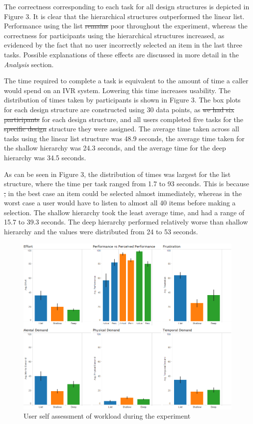 \documentclass{sigchi}
\providecommand{\DIFaddtex}[1]{{\protect\color{blue}\uwave{#1}}} %
\providecommand{\DIFdeltex}[1]{{\protect\color{red}\sout{#1}}}                      %
\providecommand{\DIFaddbegin}{} %
\providecommand{\DIFaddend}{} %
\providecommand{\DIFdelbegin}{} %
\providecommand{\DIFdelend}{} %
\providecommand{\DIFadd}[1]{\texorpdfstring{\DIFaddtex{#1}}{#1}} %
\providecommand{\DIFdel}[1]{\texorpdfstring{\DIFdeltex{#1}}{}} %
\begin{document}
The correctness corresponding to each task for all design structures is depicted in Figure 3. It is clear that the hierarchical structures outperformed the linear list. Performance using the list \DIFdelbegin \DIFdel{remains }\DIFdelend \DIFaddbegin \DIFadd{remained }\DIFaddend poor throughout the experiment, whereas the correctness for participants using the hierarchical structures increased, as evidenced by the fact that no user incorrectly selected an item in the last three tasks. Possible explanations of these effects are discussed in more detail in the \textit{Analysis} section.

The time required to complete a task is equivalent to the amount of time a caller would spend on an IVR system. Lowering this time increases usability. The distribution of times taken by participants is shown in Figure 3. The box plots for each design structure are constructed using 30 data points, as \DIFdelbegin \DIFdel{we had six participants }\DIFdelend \DIFaddbegin \DIFadd{six participants were tested }\DIFaddend for each design structure, and all users completed five tasks for the \DIFdelbegin \DIFdel{specific design }\DIFdelend structure they were assigned. The average time taken across all tasks using the linear list structure was 48.9 seconds, the average time taken for the shallow hierarchy was 24.3 seconds, and the average time for the deep hierarchy was 34.5 seconds.

As can be seen in Figure 3, the distribution of times was largest for the list structure, where the time per task ranged from 1.7 to 93 seconds. This is because \DIFdelbegin \DIFdel{, }\DIFdelend in the best case an item could be selected almost immediately, whereas in the worst case a user would have to listen to almost all 40 items before making a selection. The shallow hierarchy took the least average time, and had a range of 15.7 to 39.3 seconds. The deep hierarchy performed relatively worse than shallow hierarchy and the values were distributed from 24 to 53 seconds. 

\begin{figure}[!h]
    \centering
    \includegraphics[width=0.9\columnwidth]{fig_nasaSummary}
    \caption{User self assessment of workload during the experiment}
    \label{fig: Figure4}
\end{figure}
\end{document}
